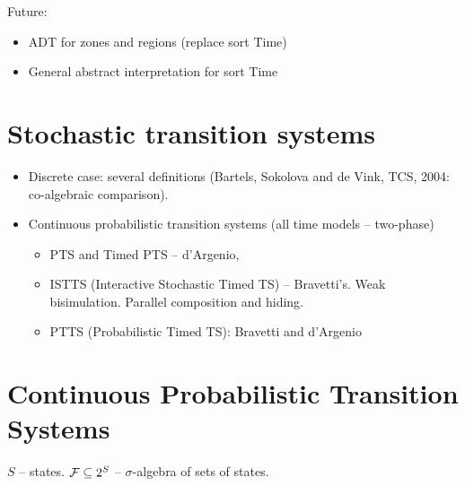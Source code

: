 \begin{slide}
\begin{itemize}
\end{itemize}
\pause
Future:
\begin{itemize}
\item ADT for zones and regions (replace sort Time)
\item General abstract interpretation for sort Time
\end{itemize}
\newslide\section*{Stochastic transition systems}
\begin{itemize}
\item Discrete case: several definitions (Bartels, Sokolova and de Vink, TCS, 2004: co-algebraic comparison).
\pause
\item Continuous probabilistic transition systems (all time models -- two-phase)
  \begin{itemize}
  \item PTS and Timed PTS -- d'Argenio,
  \item ISTTS (Interactive Stochastic Timed TS) -- Bravetti's. Weak bisimulation. Parallel composition and hiding.
  \item PTTS (Probabilistic Timed TS): Bravetti and d'Argenio
  \end{itemize}
\end{itemize}
\newslide\section*{Continuous Probabilistic Transition Systems}
$S$ -- states. ${\cal F}\subseteq 2^S$ -- $\sigma$-algebra of sets of states.


\end{slide}
